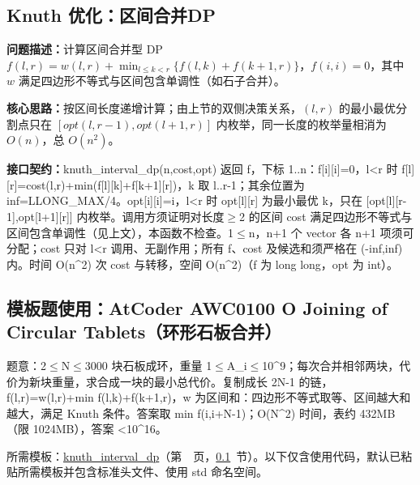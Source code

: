 \Needspace{529pt}

\subsection{Knuth 优化：区间合并DP}\label{compact-knuth_interval_dp}

\noindent\textbf{问题描述：}\allowbreak 计算区间合并型 DP $f(l,r)=w(l,r)+\min_{l\le k<r}\{f(l,k)+f(k+1,r)\}$，$f(i,i)=0$，其中 $w$ 满足四边形不等式与区间包含单调性（如石子合并）。

\textbf{核心思路：}\allowbreak 按区间长度递增计算；由上节的双侧决策关系，$(l,r)$ 的最小最优分割点只在 $[opt(l,r-1),opt(l+1,r)]$ 内枚举，同一长度的枚举量相消为 $O(n)$，总 $O(n^2)$。



{\sloppy{}\noindent\textbf{接口契约：}knuth\_interval\_dp(n,cost,opt) 返回 f，下标 1..n：f[i][i]=0，l<r 时 f[l][r]=cost(l,r)+min(f[l][k]+f[k+1][r])，k 取 l..r-1；其余位置为 inf=LLONG\_MAX/4。opt[i][i]=i，l<r 时 opt[l][r] 为最小最优 k，只在 [opt[l][r-1],opt[l+1][r]] 内枚举。调用方须证明对长度$\ge$2 的区间 cost 满足四边形不等式与区间包含单调性（见上文），本函数不检查。1$\le$n，n+1 个 vector 各 n+1 项须可分配；cost 只对 l<r 调用、无副作用；所有 f、cost 及候选和须严格在 (-inf,inf) 内。时间 O(n\textasciicircum{}2) 次 cost 与转移，空间 O(n\textasciicircum{}2)（f 为 long long，opt 为 int）。\par}



\Needspace{393pt}

\subsection*{模板题使用：AtCoder AWC0100 O Joining of Circular Tablets（环形石板合并）}

\label{usage-example-461}

题意：2$\le$N$\le$3000 块石板成环，重量 1$\le$A\_i$\le$10\textasciicircum{}9；每次合并相邻两块，代价为新块重量，求合成一块的最小总代价。复制成长 2N-1 的链，f(l,r)=w(l,r)+min f(l,k)+f(k+1,r)，w 为区间和：四边形不等式取等、区间越大和越大，满足 Knuth 条件。答案取 min f(i,i+N-1)；O(N\textasciicircum{}2) 时间，表约 432MB（限 1024MB），答案 <10\textasciicircum{}16。

所需模板：\hyperref[compact-knuth_interval_dp]{knuth\_\allowbreak{}interval\_\allowbreak{}dp}（第~\pageref{compact-knuth_interval_dp}~页，\ref{compact-knuth_interval_dp}~节）。以下仅含使用代码，默认已粘贴所需模板并包含标准头文件、使用 std 命名空间。

